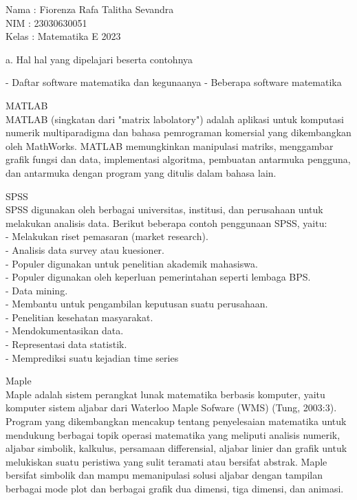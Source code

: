 \documentclass[a4paper,10pt]{article}
\begin{document}
\begin{eulernotebook}
\begin{eulercomment}
Nama  : Fiorenza Rafa Talitha Sevandra\\
NIM   : 23030630051\\
Kelas : Matematika E 2023

\end{eulercomment}
\eulersubheading{}
\begin{eulercomment}
a. Hal hal yang dipelajari beserta contohnya\\
\end{eulercomment}
\begin{eulerttcomment}
   - Daftar software matematika dan kegunaanya
   - Beberapa software matematika
\end{eulerttcomment}
\begin{eulercomment}
MATLAB\\
MATLAB (singkatan dari "matrix labolatory") adalah aplikasi untuk
komputasi numerik multiparadigma dan bahasa pemrograman komersial yang
dikembangkan oleh MathWorks. MATLAB memungkinkan manipulasi matriks,
menggambar grafik fungsi dan data, implementasi algoritma, pembuatan
antarmuka pengguna, dan antarmuka dengan program yang ditulis dalam
bahasa lain.

SPSS\\
SPSS digunakan oleh berbagai universitas, institusi, dan perusahaan
untuk melakukan analisis data. Berikut beberapa contoh penggunaan
SPSS, yaitu:\\
- Melakukan riset pemasaran (market research).\\
- Analisis data survey atau kuesioner.\\
- Populer digunakan untuk penelitian akademik mahasiswa.\\
- Populer digunakan oleh keperluan pemerintahan seperti lembaga BPS.\\
- Data mining.\\
- Membantu untuk pengambilan keputusan suatu perusahaan.\\
- Penelitian kesehatan masyarakat.\\
- Mendokumentasikan data.\\
- Representasi data statistik.\\
- Memprediksi suatu kejadian time series

Maple\\
Maple adalah sistem perangkat lunak matematika berbasis komputer,
yaitu komputer sistem aljabar dari Waterloo Maple Sofware (WMS) (Tung,
2003:3). Program yang dikembangkan mencakup tentang penyelesaian
matematika untuk mendukung berbagai topik operasi matematika yang
meliputi analisis numerik, aljabar simbolik, kalkulus, persamaan
differensial, aljabar linier dan grafik untuk melukiskan suatu
peristiwa yang sulit teramati atau bersifat abstrak. Maple bersifat
simbolik dan mampu memanipulasi solusi aljabar dengan tampilan
berbagai mode plot dan berbagai grafik dua dimensi, tiga dimensi, dan
animasi.


\end{eulercomment}
\end{eulernotebook}
\end{document}
